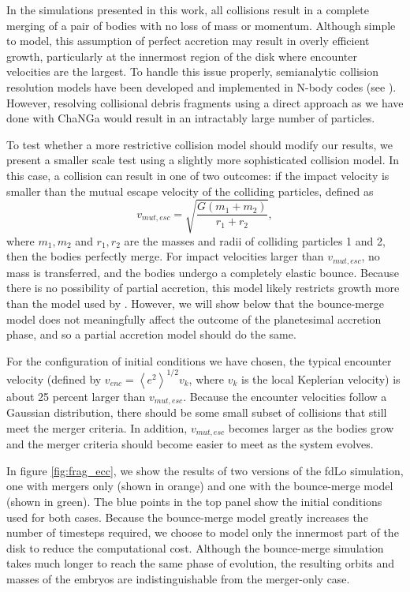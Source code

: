 \documentclass[twocolumn]{aastex63}
\begin{document}
In the simulations presented in this work, all collisions result in a complete merging of a pair of bodies with no loss of mass or momentum. Although simple to model, this assumption of perfect accretion may result in overly efficient growth, particularly at the innermost region of the disk where encounter velocities are the largest. To handle this issue properly, semianalytic collision resolution models have been developed and implemented in N-body codes (see \citet{leinhardt12}). However, resolving collisional debris fragments using a direct approach as we have done with {\sc ChaNGa} would result in an intractably large number of particles.

To test whether a more restrictive collision model should modify our results, we present a smaller scale test using a slightly more sophisticated collision model. In this case, a collision can result in one of two outcomes: if the impact velocity is smaller than the mutual escape velocity of the colliding particles, defined as
\begin{equation}\label{eq:v_mut}
	v_{mut, esc} = \sqrt{\frac{G (m_{1} + m_{2})}{r_{1} + r_{2}}},
\end{equation}
where $m_{1}, m_{2}$ and $r_{1}, r_{2}$ are the masses and radii of
colliding particles 1 and 2, then the bodies perfectly merge. For
impact velocities larger than $v_{mut, esc}$, no mass is transferred, and the bodies undergo a completely elastic bounce. Because there is no possibility of partial accretion, this model likely restricts growth more than the model used by \citet{leinhardt12}. However, we will show below that the bounce-merge model does not meaningfully affect the outcome of the planetesimal accretion phase, and so a partial accretion model should do the same.

For the configuration of initial conditions we have chosen, the typical encounter velocity (defined by $v_{enc} = \left< e^{2} \right>^{1/2} v_{k}$, where $v_{k}$ is the local Keplerian velocity) is about 25 percent larger than $v_{mut, esc}$. Because the encounter velocities follow a Gaussian distribution, there should be some small subset of collisions that still meet the merger criteria. In addition, $v_{mut, esc}$ becomes larger as the bodies grow and the merger criteria should become easier to meet as the system evolves.

In figure \ref{fig:frag_ecc}, we show the results of two versions of the fdLo simulation, one with mergers only (shown in orange) and one with the bounce-merge model (shown in green). The blue points in the top panel show the initial conditions used for both cases. Because the bounce-merge model greatly increases the number of timesteps required, we choose to model only the innermost part of the disk to reduce the computational cost. Although the bounce-merge simulation takes much longer to reach the same phase of evolution, the resulting orbits and masses of the embryos are indistinguishable from the merger-only case.
\end{document}
